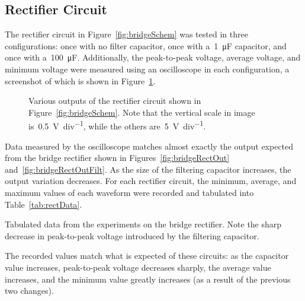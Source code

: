 \subsection{Rectifier Circuit}
The rectifier circuit in Figure~\ref{fig:bridgeSchem} was tested in three
configurations: once with no filter capacitor, once with a~\SI{1}{\micro\farad}
capacitor, and once with a~\SI{100}{\micro\farad}.  Additionally, the
peak-to-peak voltage, average voltage, and minimum voltage were measured using
an oscilloscope in each configuration, a screenshot of which is shown in
Figure~\ref{fig:rectShots}.
%
\begin{figure}[H]
	\centering
	\quad
	\quad

	\parbox{.9\textwidth}{
	\caption[Oscilloscope Screenshots --- Rectifier Circuit]{Various outputs of
	the rectifier circuit shown in Figure~\ref{fig:bridgeSchem}.  Note that the
	vertical scale in image~ is~\SI{.5}{\volt\per
	div}, while the others are~\SI{5}{\volt\per div}.}
	\label{fig:rectShots}}
\end{figure}
%
Data measured by the oscilloscope matches almost exactly the output expected
from the bridge rectifier shown in Figures~\ref{fig:bridgeRectOut}
and~\ref{fig:bridgeRectOutFilt}.  As the size of the filtering capacitor
increases, the output variation decreases.  For each rectifier circuit, the minimum, average, and maximum
values of each waveform were recorded and tabulated into
Table~\ref{tab:rectData}.
%
\begin{table}[H]
	\centering
	
	\parbox{.6\textwidth}{
	\caption[Rectifier data]{Tabulated data from the experiments on the bridge
	rectifier.  Note the sharp decrease in peak-to-peak voltage introduced by
	the filtering capacitor.}
	\label{tab:rectData}
	}
\end{table}
%
The recorded values match what is expected of these circuits: as the capacitor
value increases, peak-to-peak voltage decreases sharply, the average value
increases, and the minimum value greatly increases (as a result of the previous
two changes).


